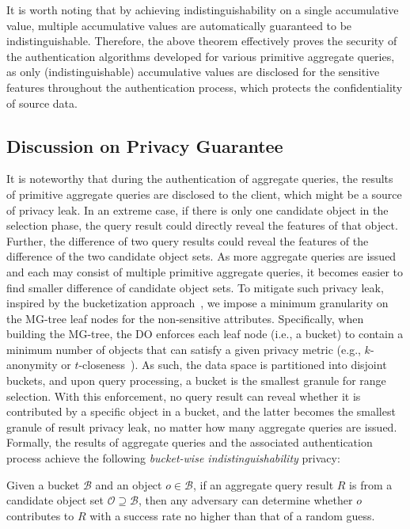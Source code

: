 It is worth noting that by achieving indistinguishability on a single accumulative value, multiple accumulative values are automatically guaranteed to be indistinguishable.
Therefore, the above theorem effectively proves the security of the authentication algorithms developed for various primitive aggregate queries, as only (indistinguishable) accumulative values are disclosed for the sensitive features throughout the authentication process, which protects the confidentiality of source data.

\subsection{Discussion on Privacy Guarantee}
It is noteworthy that during the authentication of aggregate queries, the results of primitive aggregate queries are disclosed to the client, which might be a source of privacy leak. In an extreme case, if there is only one candidate object in the selection phase, the query result could directly reveal the features of that object. Further, the difference of two query results could reveal the features of the difference of the two candidate object sets. As more aggregate queries are issued and each may consist of multiple primitive aggregate queries, it becomes easier to find smaller difference of candidate object sets. To mitigate such privacy leak, inspired by the bucketization approach~\cite{PPDP}, we impose a minimum granularity on the MG-tree leaf nodes for the non-sensitive attributes. Specifically, when building the MG-tree, the DO enforces each leaf node (i.e., a bucket) to contain a minimum number of objects that can satisfy a given privacy metric (e.g., $k$-anonymity or $t$-closeness~\cite{Samarati98,10.1109/icde.2007.367856}). As such, the data space is partitioned into disjoint buckets, and upon query processing, a bucket is the smallest granule for range selection. With this enforcement, no query result can reveal whether it is contributed by a specific object in a bucket, and the latter becomes the smallest granule of result privacy leak, no matter how many aggregate queries are issued. Formally, the results of aggregate queries and the associated authentication process achieve the following \emph{bucket-wise indistinguishability} privacy:
\begin{definition}\label{def:aggregate-queries:k-anony}
  Given a bucket $\mathcal{B}$ and an object $o\in\mathcal{B}$, if an aggregate query result $R$ is from a candidate object set $\mathcal{O}\supseteq \mathcal{B}$, then any adversary can determine whether $o$ contributes to $R$ with a success rate no higher than that of a random guess.
\end{definition}

